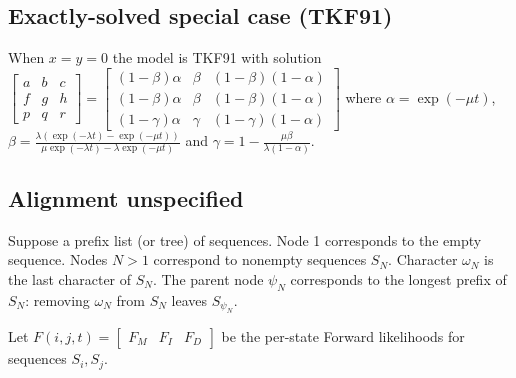 \documentclass{article}
\begin{document}
\subsection{Exactly-solved special case (TKF91)}

When $x=y=0$ the model is TKF91 \cite{ThorneEtAl91}
with solution
$
\begin{bmatrix}
a & b & c \\
f & g & h \\
p & q & r 
\end{bmatrix}
=
\begin{bmatrix}
(1-\beta)\alpha & \beta & (1-\beta)(1-\alpha) \\
(1-\beta)\alpha & \beta & (1-\beta)(1-\alpha) \\
(1-\gamma)\alpha & \gamma & (1-\gamma)(1-\alpha)
\end{bmatrix}
$
where
$\alpha = \exp(-\mu t)$,
$\beta = \frac{\lambda \left( \exp(-\lambda t) - \exp(-\mu t) \right)}{\mu \exp(-\lambda t) - \lambda \exp(-\mu t)}$
and
$\gamma = 1 - \frac{\mu \beta}{\lambda (1 - \alpha)}$.



\subsection{Alignment unspecified}

Suppose a prefix list (or tree) of sequences.
Node 1 corresponds to the empty sequence.
Nodes $N>1$ correspond to nonempty sequences $S_N$.
Character $\omega_N$ is the last character of $S_N$.
The parent node $\psi_N$ corresponds to the longest prefix of $S_N$:
removing $\omega_N$ from $S_N$ leaves $S_{\psi_N}$.

Let $F(i,j,t) = \begin{bmatrix} F_M & F_I & F_D \end{bmatrix}$
be the per-state Forward likelihoods for sequences $S_i,S_j$.
\end{document}
